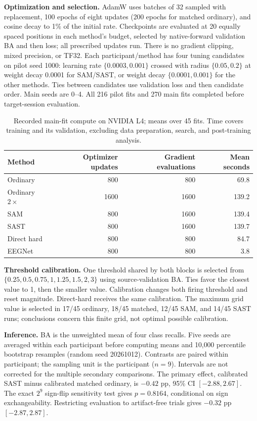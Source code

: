 \documentclass[11pt,a4paper]{article}
\begin{document}
\textbf{Optimization and selection.} AdamW uses batches of 32 sampled with
replacement, 100 epochs of eight updates (200 epochs for matched ordinary),
and cosine decay to 1\% of the initial rate. Checkpoints are evaluated at 20
equally spaced positions in each method's budget, selected by native-forward
validation BA and then loss; all prescribed updates run. There is no gradient
clipping, mixed precision, or TF32. Each participant/method has four tuning
candidates on pilot seed 1000: learning rate $\{0.0003,0.001\}$ crossed with
radius $\{0.05,0.2\}$ at weight decay 0.0001 for SAM/SAST, or weight decay
$\{0.0001,0.001\}$ for the other methods. Ties between candidates use validation
loss and then candidate order. Main seeds are 0--4. All 216 pilot fits and
270 main fits completed before target-session evaluation.

\begin{table}[h]
\centering\small
\caption{Recorded main-fit compute on NVIDIA L4; means over 45 fits.
Time covers training and its validation, excluding data preparation, search,
and post-training analysis.}
\begin{tabular}{lrrr}
\toprule
Method & Optimizer updates & Gradient evaluations & Mean seconds \\
\midrule
Ordinary & 800 & 800 & 69.8 \\
Ordinary $2\times$ & 1600 & 1600 & 139.2 \\
SAM & 800 & 1600 & 139.4 \\
SAST & 800 & 1600 & 139.7 \\
Direct hard & 800 & 800 & 84.7 \\
EEGNet & 800 & 800 & 3.8 \\
\bottomrule
\end{tabular}
\end{table}

\textbf{Threshold calibration.} One threshold shared by both blocks is
selected from $\{0.25,0.5,0.75,1,1.25,1.5,2,3\}$ using source-validation BA.
Ties favor the closest value to 1, then the smaller value. Calibration
changes both firing threshold and reset magnitude. Direct-hard receives
the same calibration. The maximum grid value is selected in 17/45 ordinary,
18/45 matched, 12/45 SAM, and 14/45 SAST runs; conclusions concern this finite
grid, not optimal possible calibration.

\textbf{Inference.} BA is the unweighted mean of four class recalls.
Five seeds are averaged within each participant before computing means and
10,000 percentile bootstrap resamples (random seed 20261012). Contrasts are
paired within participant; the sampling unit is the participant ($n=9$).
Intervals are not corrected for the multiple secondary comparisons.
The primary effect, calibrated SAST minus calibrated matched ordinary,
is $-0.42$ pp, 95\% CI $[-2.88,2.67]$. The exact $2^9$ sign-flip sensitivity
test gives $p=0.8164$, conditional on sign exchangeability. Restricting
evaluation to artifact-free trials gives $-0.32$ pp $[-2.87,2.87]$.
\end{document}
